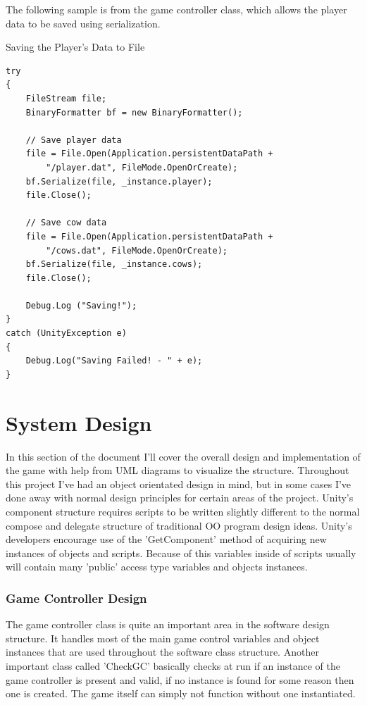 The following sample is from the game controller class, which allows the player data to be saved using serialization. 

Saving the Player's Data to File
\begin{verbatim}
try
{
	FileStream file;
	BinaryFormatter bf = new BinaryFormatter();
	
	// Save player data
	file = File.Open(Application.persistentDataPath + 
		"/player.dat", FileMode.OpenOrCreate);
	bf.Serialize(file, _instance.player);
	file.Close();
	
	// Save cow data
	file = File.Open(Application.persistentDataPath + 
		"/cows.dat", FileMode.OpenOrCreate);
	bf.Serialize(file, _instance.cows);
	file.Close();
	
	Debug.Log ("Saving!");
}
catch (UnityException e)
{
	Debug.Log("Saving Failed! - " + e);
}
\end{verbatim}

\chapter{System Design}
In this section of the document I'll cover the overall design and implementation of the game with help from UML diagrams to visualize the structure. Throughout this project I've had an object orientated design in mind, but in some cases I've done away with normal design principles for certain areas of the project. Unity's component structure requires scripts to be written slightly different to the normal compose and delegate structure of traditional OO program design ideas. Unity's developers encourage use of the 'GetComponent' method of acquiring new instances of objects and scripts. Because of this variables inside of scripts usually will contain many 'public' access type variables and objects instances.
\subsection{Game Controller Design}
The game controller class is quite an important area in the software design structure. It handles most of the main game control variables and object instances that are used throughout the software class structure. Another important class called 'CheckGC' basically checks at run if an instance of the game controller is present and valid, if no instance is found for some reason then one is created. The game itself can simply not function without one instantiated.

